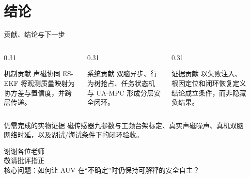 \section{结论}

\begin{frame}{贡献、结论与下一步}
  \begin{columns}[T,onlytextwidth]
    \begin{column}{0.31\textwidth}
      \begin{block}{机制贡献}
        声磁协同 ES-EKF 将观测质量映射为协方差与置信度，并跨层传递。
      \end{block}
      \centering
    \end{column}
    \begin{column}{0.31\textwidth}
      \begin{block}{系统贡献}
        双脑异步、行为树抢占、任务状态机与 UA-MPC 形成分层安全闭环。
      \end{block}
      \centering
    \end{column}
    \begin{column}{0.31\textwidth}
      \begin{block}{证据贡献}
        以失败注入、根因定位和闭环恢复定义结论成立条件，而非隐藏负结果。
      \end{block}
      \centering
    \end{column}
  \end{columns}

  \vspace{5mm}
  \begin{alertblock}{仍需完成的实物证据}
    磁传感器九参数与工频台架标定、真实声磁噪声、真机双脑网络时延，以及湖试/海试条件下的闭环验收。
  \end{alertblock}

\end{frame}

\begin{frame}
  \centering
  {\Huge 谢谢各位老师}\\[8mm]
  {\Large 敬请批评指正}\\[10mm]
  {\normalsize
    \textcolor{DefenseGray}{核心问题：如何让 AUV 在“不确定”时仍保持可解释的安全自主？}
  }
\end{frame}
